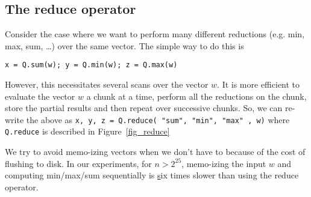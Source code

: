 \subsection{The reduce operator}
\label{reduce_operator}
Consider the case where we want to perform many different reductions (e.g. min,
max, sum, \ldots) over the same vector. The simple way to do this is
\begin{verbatim}
x = Q.sum(w); y = Q.min(w); z = Q.max(w)
\end{verbatim}
However, this necessitates several scans over the vector \(w\). It is more
efficient to evaluate the vector \(w\) a chunk at a time, perform all the
reductions on the chunk, store the partial results and then repeat over
successive chunks. So, we can re-write the above as 
{\tt x, y, z = Q.reduce({ "sum", "min", "max" }, w)}
where {\tt Q.reduce} is described in Figure~\ref{fig_reduce}

\begin{figure}
\centering
{}
\end{figure}
We try to avoid memo-izing vectors when we don't have to because 
of the cost of flushing to disk. In our experiments, for \(n > 2^{25}\), 
memo-izing the input \(w\) and computing min/max/sum sequentially 
is {\ul six} times slower than using the reduce operator.
